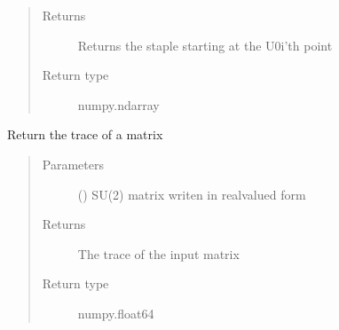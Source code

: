 \documentclass[letterpaper,10pt,english]{sphinxmanual}
\begin{document}
\begin{fulllineitems}
\begin{quote}
\begin{description}
\begin{itemize}
\end{itemize}

\item[{Returns}] \leavevmode
Returns the staple starting at the U0i’th point

\item[{Return type}] \leavevmode
numpy.ndarray

\end{description}\end{quote}

\end{fulllineitems}


\begin{fulllineitems}
\label{\detokenize{index:su2.tr}}
Return the trace of a matrix
\begin{quote}\begin{description}
\item[{Parameters}] \leavevmode
{} () \textendash{} SU(2) matrix writen in real\sphinxhyphen{}valued form

\item[{Returns}] \leavevmode
The trace of the input matrix

\item[{Return type}] \leavevmode
numpy.float64

\end{description}\end{quote}

\end{fulllineitems}

\end{document}
